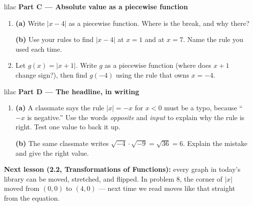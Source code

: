 \documentclass[10pt]{article}
\begin{document}
\vspace{0.06in}

\begin{headlinebox}{lilac}
\textbf{\color{plum}Part C --- Absolute value as a piecewise function}
\end{headlinebox}

\begin{enumerate}[leftmargin=1.9em, itemsep=7pt, start=8]

\item \textbf{(a)} Write $|x - 4|$ as a piecewise function. Where is the break, and why
      there?

      \textbf{(b)} Use your rules to find $|x - 4|$ at $x = 1$ and at $x = 7$. Name the rule
      you used each time.

\item Let $g(x) = |x + 1|$. Write $g$ as a piecewise function (where does $x + 1$ change
      sign?), then find $g(-4)$ using the rule that owns $x = -4$.

\end{enumerate}

\vspace{0.06in}

\begin{headlinebox}{lilac}
\textbf{\color{plum}Part D --- The headline, in writing}
\end{headlinebox}

\begin{enumerate}[leftmargin=1.9em, itemsep=7pt, start=10]

\item \textbf{(a)} A classmate says the rule $|x| = -x$ for $x < 0$ must be a typo, because
      ``$-x$ is negative.'' Use the words \emph{opposite} and \emph{input} to explain why the
      rule is right. Test one value to back it up.

      \textbf{(b)} The same classmate writes $\sqrt{-4}\cdot\sqrt{-9} = \sqrt{36} = 6$. Explain
      the mistake and give the right value.

\end{enumerate}

\boxguard[5]
\begin{spiralbox}
\small
\textbf{Next lesson (2.2, Transformations of Functions):} every graph in today's library can
be moved, stretched, and flipped. In problem 8, the corner of $|x|$ moved from $(0, 0)$ to
$(4, 0)$ --- next time we read moves like that straight from the equation.
\end{spiralbox}
\end{document}
